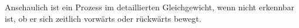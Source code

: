 Anschaulich ist ein Prozess im detaillierten Gleichgewicht, wenn nicht erkennbar ist, ob er sich zeitlich vorwärts oder rückwärts bewegt.